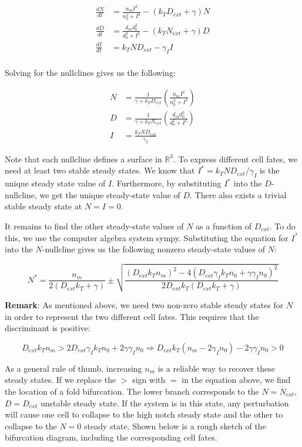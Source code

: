 \documentclass{article}
\begin{document}
\begin{flushleft}
$$
\begin{aligned}
  \frac{dN}{dt} &= \frac{n_{m}I^2}{n_{0}^2 + I^2} - (k_{T}D_{ext} + \gamma)N \\[5pt]
  \frac{dD}{dt} &= \frac{d_{m}d_{0}^2}{d_{0}^2 + I^2} - (k_{T}N_{ext} + \gamma)D \\[5pt]
  \frac{dI}{dt} &= k_{T}ND_{ext} - \gamma_{I}I \\[5pt]
\end{aligned}
$$

Solving for the nullclines gives us the following:

$$
\begin{aligned}
  N &= \frac{1}{\gamma + k_{T}D_{ext}}\left(\frac{n_{m}I^2}{n_{0}^2 + I^2}\right) \\[5pt]
  D &= \frac{1}{\gamma + k_{T}N_{ext}}\left( \frac{d_{m}d_{0}^2}{d_{0}^2 + I^2} \right) \\[5pt]
  I &= \frac{k_{T}ND_{ext}}{\gamma_{I}}
\end{aligned}
$$

Note that each nullcline defines a surface in $\mathbb{R}^3$. To express different cell fates, we need at least two stable steady states. We know that $I^{*} = k_{T}ND_{ext} / \gamma_{I}$ is the unique steady state value of $I$. Furthermore, by substituting $I^{*}$ into the $D$-nullcline, we get the unique steady-state value of $D$. There also exists a trivial stable steady state at $N = I = 0$. 

\medskip

It remains to find the other steady-state values of $N$ as a function of $D_{ext}$. To do this, we use the computer algebra system sympy. Substituting the equation for $I^{*}$ into the $N$-nullcline gives us the following nonzero steady-state values of $N$:

\medskip

$$
N^{*} = \frac{n_{m}}{2(D_{ext}k_{T} + \gamma)} \pm \sqrt{\frac{(D_{ext}k_{T}n_{m})^2 - 4(D_{ext}\gamma_{I}k_{T}n_{0} + \gamma \gamma_{I}n_{0})^2}{2D_{ext}k_{T}(D_{ext}k_{T} + \gamma)}}
$$

\textbf{Remark}: As mentioned above, we need two non-zero stable steady states for $N$ in order to represent the two different cell fates. This requires that the discriminant is positive:

$$D_{ext}k_{T}n_{m} > 2D_{ext}\gamma_{I}k_{T}n_{0} + 2\gamma \gamma_{I} n_{0} \Rightarrow D_{ext}k_{T}(n_{m} - 2\gamma_{I}n_{0}) - 2\gamma \gamma_{I} n_{0} > 0$$

As a general rule of thumb, increasing $n_{m}$ is a reliable way to recover these steady states. If we replace the $>$ sign with $=$ in the equation above, we find the location of a fold bifurcation. The lower branch corresponds to the $N = N_{ext}$, $D = D_{ext}$ unstable steady state. If the system is in this state, any perturbation will cause one cell to collapse to the high notch steady state and the other to collapse to the $N = 0$ steady state. Shown below is a rough sketch of the bifurcation diagram, including the corresponding cell fates.


\end{flushleft}
\end{document}
